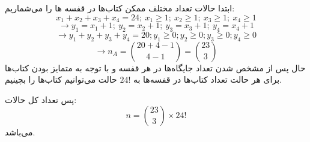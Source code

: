 \documentclass[12pt,onecolumn,a4paper]{article}
\begin{document}
ابتدا حالات تعداد مختلف ممکن کتاب‌ها در قفسه ها را می‌شماریم:
$$x_1+x_2+x_3+x_4=24;\: x_1\geq 1;\: x_2\geq 1;\: x_3\geq 1;\: x_4\geq 1$$
$$\rightarrow y_1=x_1+1;\: y_2=x_2+1;\: y_3=x_3+1;\: y_4=x_4+1$$
$$\rightarrow y_1+y_2+y_3+y_4=20; y_1\geq 0; y_2\geq 0; y_3\geq 0; y_4\geq 0$$
$$\rightarrow n_A = {20+4-1 \choose 4-1} = {23 \choose 3}$$
حال پس از مشخص شدن تعداد جایگاه‌ها در هر قفسه و با توجه به متمایز بودن کتاب‌ها برای هر حالت تعداد کتاب‌ها در قفسه‌ها به 
$24!$
حالت می‌توانیم کتاب‌ها را بچینیم.

پس تعداد کل حالات:
$$n = {23 \choose 3} \times 24!$$
می‌باشد.
\end{document}
